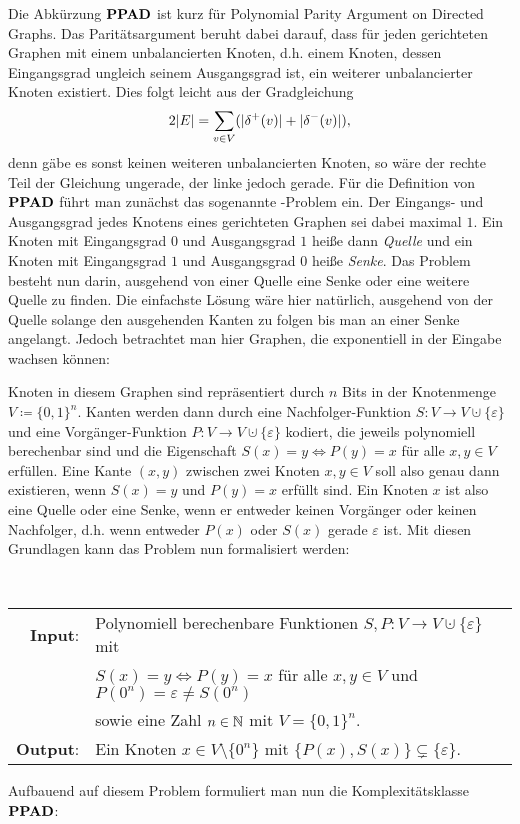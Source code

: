 Die Abkürzung $\textbf{PPAD}$ ist kurz für \glqq Polynomial Parity Argument on Directed Graphs\grqq.
Das Paritätsargument beruht dabei darauf, dass für jeden gerichteten Graphen mit einem unbalancierten Knoten, d.h. einem Knoten, dessen Eingangsgrad ungleich seinem Ausgangsgrad ist, ein weiterer unbalancierter Knoten existiert.
Dies folgt leicht aus der Gradgleichung
\[
	2 \lvert E\rvert = \sum_{v\in V} ( \lvert\delta^+(v)\rvert + \lvert\delta^-(v)\rvert ),
\]
denn gäbe es sonst keinen weiteren unbalancierten Knoten, so wäre der rechte Teil der Gleichung ungerade, der linke jedoch gerade.
Für die Definition von~$\textbf{PPAD}$ führt man zunächst das sogenannte \EndOfTheLine-Problem ein.
Der Eingangs- und Ausgangsgrad jedes Knotens eines gerichteten Graphen sei dabei maximal $1$.
Ein Knoten mit Eingangsgrad $0$ und Ausgangsgrad $1$ heiße dann \emph{Quelle} und ein Knoten mit Eingangsgrad $1$ und Ausgangsgrad $0$ heiße \emph{Senke}.
Das Problem besteht nun darin, ausgehend von einer Quelle eine Senke oder eine weitere Quelle zu finden.
Die einfachste Lösung wäre hier natürlich, ausgehend von der Quelle solange den ausgehenden Kanten zu folgen bis man an einer Senke angelangt.
Jedoch betrachtet man hier Graphen, die exponentiell in der Eingabe wachsen können:

Knoten in diesem Graphen sind repräsentiert durch $n$ Bits in der Knotenmenge $V\coloneq \{ 0,1 \}^n$.
Kanten werden dann durch eine Nachfolger-Funktion $S: V\rightarrow V\cupdot \{ \varepsilon \}$ und eine Vorgänger-Funktion $P: V\rightarrow V \cupdot \{ \varepsilon \}$ kodiert, die jeweils polynomiell berechenbar sind und die Eigenschaft $S(x) = y \Leftrightarrow P(y) = x$ für alle $x,y \in V$ erfüllen.
Eine Kante $(x,y)$ zwischen zwei Knoten $x,y \in V$ soll also genau dann existieren, wenn $S(x) = y$ und $P(y) = x$ erfüllt sind.
Ein Knoten $x$ ist also eine Quelle oder eine Senke, wenn er entweder keinen Vorgänger oder keinen Nachfolger, d.h. wenn entweder $P(x)$ oder $S(x)$ gerade $\varepsilon$ ist.
Mit diesen Grundlagen kann das Problem nun formalisiert werden:
\begin{center}
	\begin{mdframed}
		\centering
		\emph{\EndOfTheLine} \\[1em]
		\begin{tabular}{rl}
			{\bfseries Input}: &Polynomiell berechenbare Funktionen $S,P: V\rightarrow V\cupdot \{ \varepsilon \}$ mit\\
			& $S(x) = y \Leftrightarrow P(y) = x$ für alle $x,y \in V$ und
			$P(0^n) = \varepsilon \neq S(0^n)$\\
			& sowie eine Zahl $n\in\mathbb{N}$ mit $V = \{ 0, 1 \}^n$.\\
			{\bfseries Output}: & Ein Knoten $x\in V\setminus \{ 0^n \}$ mit $\{ P(x), S(x) \} \subsetneq \{ \varepsilon \}$.
		\end{tabular}
	\end{mdframed}
\end{center}
Aufbauend auf diesem Problem formuliert man nun die Komplexitätsklasse~$\textbf{PPAD}$:

